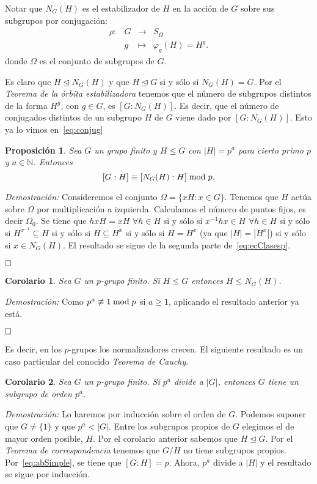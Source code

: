 \documentclass[12pt]{article}
\newtheorem{proposition}[theorem]{Proposición}
\newtheorem{corolario}{Corolario}[theorem]
\begin{document}
Notar que $N_G(H)$ es el estabilizador de $H$ en la acción de $G$ sobre sus subgrupos por conjugación:
 $$\begin{array}{rccl}
\rho\colon &G& \longrightarrow &S_{\Omega}\\
&g& \longmapsto &\varphi_{g}(H) = H^{g}.
\end{array}
$$
donde $\Omega$ es el conjunto de subgrupos de $G$.

Es claro que $H \unlhd N_G(H)$ y que $H \unlhd G$ si y sólo si $N_G(H) =G$. Por el \textit{Teorema de la órbita estabilizadora} tenemos que el número de subgrupos distintos de la forma $H^g$, con $g \in G$, es $[G:N_G(H)]$. Es decir, que el número de conjugados distintos de un subgrupo $H$ de $G$ viene dado por $[G:N_G(H)]$. Esto ya lo vimos en~\ref{eq:conjug}

\begin{proposition}Sea $G$ un grupo finito y $H \leq G$ con $|H| = p^a$ para cierto primo $p$ y $a \in \mathbb{N}$. Entonces $$[G:H] \equiv [N_G(H):H] \hspace{0.1cm}\text{mod} \hspace{0.1cm} p.$$
\end{proposition}
\emph{Demostración: }Consideremos el conjunto $\Omega = \lbrace xH : x \in G \rbrace$. Tenemos que $H$ actúa sobre $\Omega$ por multiplicación a izquierda. Calculamos el número de puntos fijos, es decir $\Omega_0$. Se tiene que $hxH = xH$ $\forall h \in H$ si y sólo si $x^{-1}hx \in H$ $\forall h \in H$ si y sólo si $H^{x^{-1}} \subseteq H$ si y sólo si $H \subseteq H ^x$ si y sólo si $H = H^x$ (ya que $|H| = |H^x|$) si y sólo si $x\in N_G(H)$. El resultado se sigue de la segunda parte de~\ref{eq:ecClasesp}.

$\hfill \square$

\begin{corolario}\label{eq:cor411} Sea $G$ un $p$-grupo finito. Si $H \leq G$ entonces $H \leq N_G(H)$.
\end{corolario}
\emph{Demostración: }Como $p^a \not\equiv 1 \hspace{0.1cm}\text{mod} \hspace{0.1cm} p$ si $a \geq 1$, aplicando el resultado anterior ya está.

$\hfill \square$

Es decir, en los $p$-grupos los normalizadores crecen. El siguiente resultado es un caso particular del conocido \textit{Teorema de Cauchy}.

\begin{corolario}\label{eq:cor412} Sea $G$ un $p$-grupo finito. Si $p^a$ divide a $|G|$, entonces $G$ tiene un subgrupo de orden $p^a$.
\end{corolario}
\emph{Demostración: }Lo haremos por inducción sobre el orden de $G$. Podemos suponer que $G \neq \lbrace 1 \rbrace$ y que $p^a < |G|$. Entre los subgrupos propios de $G$ elegimos el de mayor orden posible, $H$. Por el corolario anterior sabemos que $H \unlhd G$. Por el \textit{Teorema de correspondencia} tenemos que $G/H$ no tiene subgrupos propios. Por~\ref{eq:abSimple}, se tiene que $[G:H] = p$. Ahora, $p^a$ divide a $|H|$ y el resultado se sigue por inducción.
\end{document}
